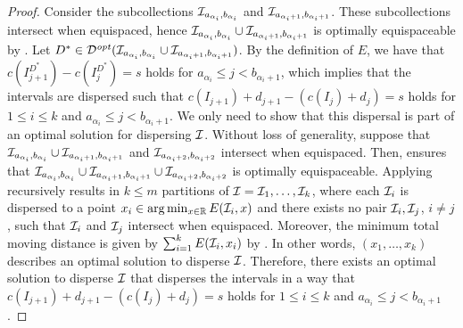 \begin{proof}
    Consider the subcollections $\mathcal{I}_{a_{\alpha_{i}},b_{\alpha_{i}}}$ and $\mathcal{I}_{a_{\alpha_{i}+1},b_{\alpha_{i}+1}}$.
    These subcollections intersect when equispaced, hence $\mathcal{I}_{a_{\alpha_{i}},b_{\alpha_{i}}} \cup \mathcal{I}_{a_{\alpha_{i}+1},b_{\alpha_{i}+1}}$ is optimally equispaceable by .
    Let $D^* \in \mathcal{D}^{\mathit{opt}}(\mathcal{I}_{a_{\alpha_{i}},b_{\alpha_{i}}} \cup \mathcal{I}_{a_{\alpha_{i}+1},b_{\alpha_{i}+1}})$.
    By the definition of $E$, we have that $c(I^{D^*}_{j+1}) - c(I^{D^*}_{j}) = s$ holds for $a_{\alpha_i} \le j < b_{\alpha_i + 1}$, which implies that the intervals are dispersed such that $c(I_{j+1})+d_{j+1} - \left(c(I_j) + d_j\right) = s$ holds for $1 \le i \le k$ and $a_{\alpha_i} \le j < b_{\alpha_i + 1}$.
    We only need to show that this dispersal is part of an optimal solution for dispersing $\mathcal{I}$.
    Without loss of generality, suppose that $\mathcal{I}_{a_{\alpha_{i}},b_{\alpha_{i}}} \cup \mathcal{I}_{a_{\alpha_{i}+1},b_{\alpha_{i}+1}}$ and $\mathcal{I}_{a_{\alpha_{i}+2},b_{\alpha_{i}+2}}$ intersect when equispaced. 
    Then,  ensures that $\mathcal{I}_{a_{\alpha_{i}},b_{\alpha_{i}}} \cup \mathcal{I}_{a_{\alpha_{i}+1},b_{\alpha_{i}+1}} \cup \mathcal{I}_{a_{\alpha_{i}+2},b_{\alpha_{i}+2}}$ is optimally equispaceable.
    Applying  recursively results in $k\le m$ partitions of $\mathcal{I} = \mathcal{I}_1,\ldots,\mathcal{I}_k$, where each $\mathcal{I}_i$ is dispersed to a point $x_i \in \argmin_{x\in \mathbb{R}} E(\I_i,x)$ and there exists no pair $\mathcal{I}_i,\mathcal{I}_{j}$, $i\neq j$, such that $\mathcal{I}_i$ and $\mathcal{I}_j$ intersect when equispaced.
    Moreover, the minimum total moving distance is given by $\sum_{i=1}^k E(\mathcal{I}_i,x_i)$ by .
    In other words, $(x_1,\ldots,x_k)$ describes an optimal solution to disperse $\mathcal{I}$.
    Therefore, there exists an optimal solution to disperse $\mathcal{I}$ that disperses the intervals in a way that $c(I_{j+1})+d_{j+1} - \left(c(I_j) + d_j\right) = s$ holds for $1 \le i \le k$ and $a_{\alpha_i} \le j < b_{\alpha_i + 1}$.
\end{proof}

